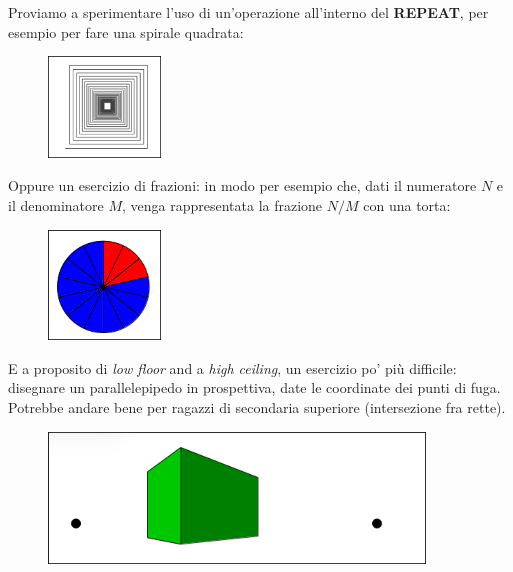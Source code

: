 \vskip 1cm

\begin{minipage}{0.40\textwidth}
Proviamo a sperimentare l'uso di un'operazione all'interno del \textbf{REPEAT}, per esempio per fare una spirale quadrata: 
\end{minipage}
\begin{minipage}{0.4\textwidth}
\begin{figure}[H]
   \includegraphics[width=3.0cm,trim=4 4 8 4,clip]{./images/ripetere/ripetere-12.png}
   \label{rip-12}
\end{figure}
\end{minipage} \hfill

\vskip 1cm

\begin{minipage}{0.40\textwidth}
Oppure un esercizio di frazioni: in modo per esempio che, dati il numeratore $N$ e il denominatore $M$, venga rappresentata la frazione $N/M$ con una torta:
\end{minipage}
\begin{minipage}{0.4\textwidth}
\begin{figure}[H]
   \includegraphics[width=3.0cm,trim=4 4 8 4,clip]{./images/ripetere/ripetere-13.png}
   \label{rip-13}
\end{figure}
\end{minipage} \hfill

E a proposito di \textit{low floor} and a \textit{high ceiling}, un esercizio  po' più difficile: disegnare un parallelepipedo in prospettiva, date le coordinate dei punti di fuga. Potrebbe andare bene per ragazzi di secondaria superiore (intersezione fra rette).

\vskip 1cm

\begin{figure}[H]
   \centering
   \includegraphics[width=10.0cm,trim=4 4 8 4,clip]{./images/ripetere/ripetere-14.png}
   \label{rip-14}
\end{figure}

